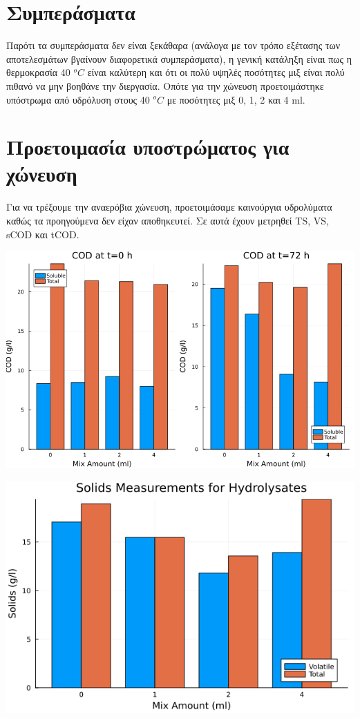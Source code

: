 \documentclass[11pt]{article}
\begin{document}
\section{Συμπεράσματα}
\label{sec:org1d2ddb3}
Παρότι τα συμπεράσματα δεν είναι ξεκάθαρα (ανάλογα με τον τρόπο εξέτασης των αποτελεσμάτων βγαίνουν διαφορετικά συμπεράσματα), η γενική κατάληξη είναι πως η θερμοκρασία 40 \(^oC\) είναι καλύτερη και ότι οι πολύ υψηλές ποσότητες μιξ είναι πολύ πιθανό να μην βοηθάνε την διεργασία. Οπότε για την χώνευση προετοιμάστηκε υπόστρωμα από υδρόλυση στους 40 \(^oC\) με ποσότητες μιξ 0, 1, 2 και 4 ml. 

\section{Προετοιμασία υποστρώματος για χώνευση}
\label{sec:org4ee24df}
Για να τρέξουμε την αναερόβια χώνευση, προετοιμάσαμε καινούργια υδρολύματα καθώς τα προηγούμενα δεν είχαν αποθηκευτεί. Σε αυτά έχουν μετρηθεί TS, VS, sCOD και tCOD.
\begin{center}
\includegraphics[width=.9\linewidth]{../plots/26_03/complete_cod_bar_26_03.png}
\end{center}

\begin{center}
\includegraphics[width=.9\linewidth]{../plots/26_03/ts_vs_bar_plot_26_03.png}
\end{center}
\end{document}
